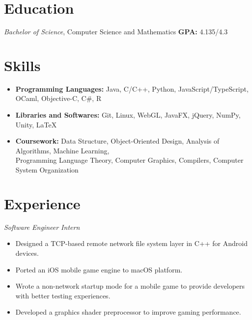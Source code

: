 \documentclass{resume}
\begin{document}



\section{Education}
\textit{Bachelor of Science}, Computer Science and Mathematics \quad \textbf{GPA: }4.135/4.3

\section{Skills}
\begin{itemize}[parsep=0.5ex]
  \item \textbf{Programming Languages:} Java, C/C++, Python, JavaScript/TypeScript, OCaml, Objective-C, C\#, R
  \item \textbf{Libraries and Softwares:} Git, Linux, WebGL, JavaFX, jQuery, NumPy, Unity, \LaTeX
  \item \textbf{Coursework: }Data Structure, Object-Oriented Design, Analysis of Algorithms, Machine Learning, \\
  Programming Language Theory, Computer Graphics, Compilers, Computer System Organization
\end{itemize}

\section{Experience}
\textit{Software Engineer Intern}
\begin{itemize}
  \item Designed a TCP-based remote network file system layer in C++ for Android devices.
  \item Ported an iOS mobile game engine to macOS platform.
  \item Wrote a non-network startup mode for a mobile game to provide developers with better testing experiences.
  \item Developed a graphics shader preprocessor to improve gaming performance.
\end{itemize}
\end{document}
